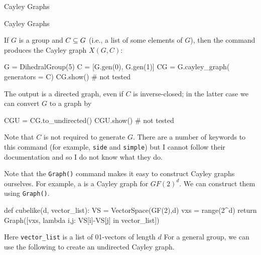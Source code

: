 \begin{chap}{Cayley Graphs}
%
\begin{sect}{Cayley Graphs}
\begin{para}
If $G$ is a group and $C\subseteq G$ (i.e., a list of some elements of $G$), then the 
command produces the Cayley graph $X(G,C)$:
\end{para}
%
\begin{sagecode}
\begin{sageinput}
G = DihedralGroup(5)
C = [G.gen(0), G.gen(1)]
CG = G.cayley_graph( generators = C)
CG.show()  # not tested
\end{sageinput}
\end{sagecode}
%
\begin{para}
The output is a directed graph, even if $C$ is inverse-closed; in the latter
case we can convert $G$ to a graph by
\end{para}
%
\begin{sagecode}
\begin{sageinput}
CGU = CG.to_undirected()
CGU.show()  # not tested
\end{sageinput}
\begin{sageoutput}
\end{sageoutput}
\end{sagecode}
%
\begin{para}
Note that $C$ is not required to generate $G$. There are a number of keywords
to this command (for example, \texttt{side} and \texttt{simple}) but I cannot
follow their documentation and so I do not know what they do.
\end{para}
%
\begin{para}
Note that the \texttt{Graph()} command makes it easy to construct Cayley
graphs ourselves. For example, a  is a Cayley
graph for $GF(2)^d$. We can construct them using \texttt{Graph()}.
\end{para}
%
\begin{sagecode}
\begin{sageinput}
def cubelike(d, vector_list):
    VS = VectorSpace(GF(2),d)
    vxs = range(2^d)
    return Graph([vxs, lambda i,j: VS[i]-VS[j] in vector_list])
\end{sageinput}
\end{sagecode}
%
\begin{para}
Here \verb|vector_list| is a list of 01-vectors of length $d$
For a general group, we can use the following to create an undirected Cayley graph.
\end{para}
%
\begin{sagecode}

\end{sagecode}
\end{sect}
\end{chap}

